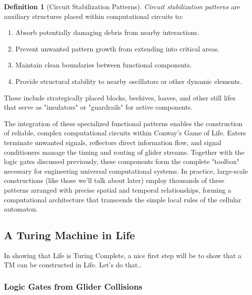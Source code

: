 \documentclass{article}
\theoremstyle{definition}
\newtheorem{definition}{Definition}[section]
\theoremstyle{plain}
\theoremstyle{plain}
\begin{document}
\begin{definition}[Circuit Stabilization Patterns]
\textit{Circuit stabilization patterns} are auxiliary structures placed within computational circuits to:
\begin{enumerate}
  \item Absorb potentially damaging debris from nearby interactions.
  \item Prevent unwanted pattern growth from extending into critical areas.
  \item Maintain clean boundaries between functional components.
  \item Provide structural stability to nearby oscillators or other dynamic elements.
\end{enumerate}

These include strategically placed blocks, beehives, loaves, and other still lifes that serve as "insulators" or "guardrails" for active components.
\end{definition}

The integration of these specialized functional patterns enables the construction of reliable, complex computational circuits within Conway's Game of Life. Eaters terminate unwanted signals, reflectors direct information flow, and signal conditioners manage the timing and routing of glider streams. Together with the logic gates discussed previously, these components form the complete "toolbox" necessary for engineering universal computational systems. In practice, large-scale constructions (like those we'll talk about later) employ thousands of these patterns arranged with precise spatial and temporal relationships, forming a computational architecture that transcends the simple local rules of the cellular automaton.



\subsection{A Turing Machine in Life}


In showing that Life is Turing Complete, a nice first step will be to show that a TM can be constructed in Life. Let's do that..

\subsubsection{Logic Gates from Glider Collisions}
\end{document}
